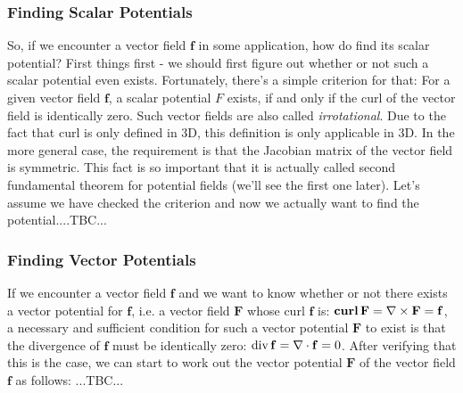 


\subsubsection{Finding Scalar Potentials}
So, if we encounter a vector field $\mathbf{f}$ in some application, how do find its scalar potential? First things first - we should first figure out whether or not such a scalar potential even exists. Fortunately, there's a simple criterion for that: For a given vector field $\mathbf{f}$, a scalar potential $F$ exists, if and only if the curl of the vector field is identically zero. Such vector fields are also called \emph{irrotational}. Due to the fact that curl is only defined in 3D, this definition is only applicable in 3D. In the more general case, the requirement is that the Jacobian matrix of the vector field is symmetric. This fact is so important that it is actually called second fundamental theorem for potential fields (we'll see the first one later). %
Let's assume we have checked the criterion and now we actually want to find the potential....TBC...


\subsubsection{Finding Vector Potentials}
If we encounter a vector field $\mathbf{f}$ and we want to know whether or not there exists a vector potential for $\mathbf{f}$, i.e. a vector field $\mathbf{F}$ whose curl $\mathbf{f}$ is: $\operatorname{\mathbf{curl}} \mathbf{F} = \nabla \times \mathbf{F} = \mathbf{f}$, a necessary and sufficient condition for such a vector potential $\mathbf{F}$ to exist is that the divergence of $\mathbf{f}$ must be identically zero: $\operatorname{div} \mathbf{f} = \nabla \cdot \mathbf{f} = 0$. After verifying that this is the case, we can start to work out the vector potential $\mathbf{F}$ of the vector field $\mathbf{f}$ as follows: ...TBC...

